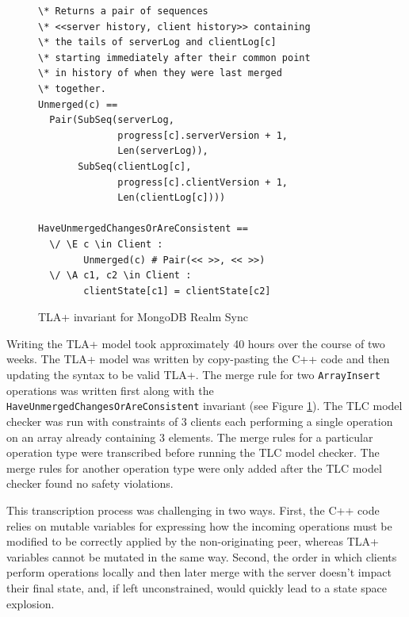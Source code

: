 \documentclass{vldb}
\begin{document}
\begin{figure}
\begin{verbatim}
\* Returns a pair of sequences
\* <<server history, client history>> containing
\* the tails of serverLog and clientLog[c]
\* starting immediately after their common point
\* in history of when they were last merged
\* together.
Unmerged(c) ==
  Pair(SubSeq(serverLog,
              progress[c].serverVersion + 1,
              Len(serverLog)),
       SubSeq(clientLog[c],
              progress[c].clientVersion + 1,
              Len(clientLog[c])))

HaveUnmergedChangesOrAreConsistent ==
  \/ \E c \in Client :
        Unmerged(c) # Pair(<< >>, << >>)
  \/ \A c1, c2 \in Client :
        clientState[c1] = clientState[c2]
\end{verbatim}
\caption{TLA+ invariant for MongoDB Realm Sync}
\label{fig:tlaplus_realm_sync_invariant}
\end{figure}

Writing the TLA+ model took approximately 40 hours over the course of two weeks. The TLA+ model was written by copy-pasting the C++ code and then updating the syntax to be valid TLA+. The merge rule for two \texttt{ArrayInsert} operations was written first along with the \\ \texttt{HaveUnmergedChangesOrAreConsistent} invariant (see Figure \ref{fig:tlaplus_realm_sync_invariant}). The TLC model checker was run with constraints of 3 clients each performing a single operation on an array already containing 3 elements.
The merge rules for a particular operation type were transcribed before running the TLC model checker. The merge rules for another operation type were only added after the TLC model checker found no safety violations.

This transcription process was challenging in two ways. First, the C++ code relies on mutable variables for expressing how the incoming operations must be modified to be correctly applied by the non-originating peer, whereas TLA+ variables cannot be mutated in the same way. Second, the order in which clients perform operations locally and then later merge with the server doesn't impact their final state, and, if left unconstrained, would quickly lead to a state space explosion.
\end{document}
